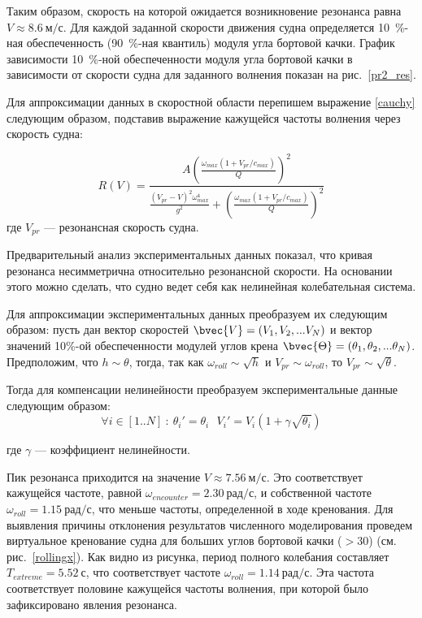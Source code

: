 Таким образом, скорость на которой ожидается возникновение резонанса равна $V \approx 8.6\ \text{м/с}$.
Для каждой заданной скорости движения судна определяется 10~\%-ная обеспеченность (90~\%-ная квантиль) модуля угла бортовой качки. График зависимости 10~\%-ной обеспеченности модуля угла бортовой качки в зависимости от скорости судна для заданного волнения  показан на рис.~\ref{pr2_res}.

Для аппроксимации данных в скоростной области перепишем выражение \eqref{cauchy} следующим образом, подставив выражение кажущейся частоты волнения через скорость судна:

\begin{equation}
	R(V) 
		=  \frac{ A \left(   \frac{\omega_{max} (1 + V_{pr}/c_{max})} {Q}   \right) ^2 }
				{
				\frac{ (V_{pr}-V)^2 \omega_{max}^4 } { g^2 }
				+
				\left(   \frac{\omega_{max} (1 + V_{pr}/c_{max})} {Q}   \right) ^2
				}
\end{equation}
где $V_{pr}$ --- резонансная скорость судна.

Предварительный анализ экспериментальных данных показал, что кривая резонанса несимметрична относительно резонансной скорости.
На основании этого можно сделать, что судно ведет себя как нелинейная колебательная система. 

Для аппроксимации экспериментальных данных преобразуем их следующим образом: пусть дан вектор скоростей $\bvec{V}=(V_1,V_2,...V_N)$ и
вектор значений 10\%-ой обеспеченности модулей углов крена $\bvec{\Theta}=(\theta_1,\theta_2,...\theta_N)$. 
Предположим, что $h \sim \theta$, тогда, так как $\omega_{roll} \sim \sqrt{h}$ и $V_{pr} \sim \omega_{roll}$, то 
$V_{pr} \sim \sqrt{\theta}$.

Тогда для компенсации нелинейности преобразуем экспериментальные данные следующим образом:
\begin{equation}
		\forall i \in [1..N]\ :\ 
		\theta_i' = \theta_i\ \ \		
		V_i' = V_i (1 + \gamma \sqrt{\theta_i})
\end{equation}

где $\gamma$ --- коэффициент нелинейности.

Пик резонанса приходится на значение $V \approx 7.56\ \text{м/с}$.
Это соответствует кажущейся частоте, равной $\omega_{encounter} = 2.30\ \text{рад/с}$, и собственной частоте $\omega_{roll} = 1.15\ \text{рад/с}$, 
что меньше частоты, определенной в ходе кренования. 
Для выявления причины отклонения результатов численного моделирования проведем виртуальное кренование судна для больших углов бортовой качки ($>30$) (см. рис.~\ref{rollingx}). Как видно из рисунка, период полного колебания составляет $T_{extreme} = 5.52\ \text{с}$, что соответствует частоте $\omega_{roll} = 1.14\ \text{рад/с}$. Эта частота соответствует половине кажущейся частоты волнения, при которой было зафиксировано явления резонанса.

